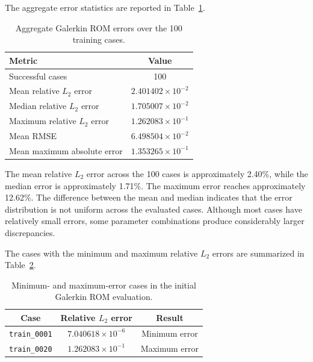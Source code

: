 The aggregate error statistics are reported in
Table~\ref{tab:initial_galerkin_errors}.

\begin{table}[htbp]
    \centering
    \caption{Aggregate Galerkin ROM errors over the
    100 training cases.}
    \label{tab:initial_galerkin_errors}
    \begin{tabular}{lc}
        \toprule
        \textbf{Metric} & \textbf{Value} \\
        \midrule
        Successful cases & 100 \\
        Mean relative $L_2$ error & $2.401402\times10^{-2}$ \\
        Median relative $L_2$ error & $1.705007\times10^{-2}$ \\
        Maximum relative $L_2$ error & $1.262083\times10^{-1}$ \\
        Mean RMSE & $6.498504\times10^{-2}$ \\
        Mean maximum absolute error & $1.353265\times10^{-1}$ \\
        \bottomrule
    \end{tabular}
\end{table}

The mean relative $L_2$ error across the 100 cases is
approximately 2.40\%, while the median error is
approximately 1.71\%. The maximum error reaches
approximately 12.62\%. The difference between the mean
and median indicates that the error distribution is
not uniform across the evaluated cases. Although most
cases have relatively small errors, some parameter
combinations produce considerably larger discrepancies.

The cases with the minimum and maximum relative
$L_2$ errors are summarized in
Table~\ref{tab:initial_galerkin_extremes}.

\begin{table}[htbp]
    \centering
    \caption{Minimum- and maximum-error cases in the
    initial Galerkin ROM evaluation.}
    \label{tab:initial_galerkin_extremes}
    \begin{tabular}{ccc}
        \toprule
        \textbf{Case} &
        \textbf{Relative $L_2$ error} &
        \textbf{Result} \\
        \midrule
        \texttt{train\_0001} &
        $7.040618\times10^{-6}$ &
        Minimum error \\
        \texttt{train\_0020} &
        $1.262083\times10^{-1}$ &
        Maximum error \\
        \bottomrule
    \end{tabular}
\end{table}


